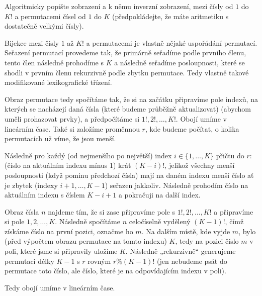 \documentclass[12pt]{article}                   %
\begin{document}
    \begin{priklad}[permBi]
        Algoritmicky popište zobrazení a k němu inverzní zobrazení, mezi čísly od $1$ do $K!$ a permutacemi čísel od $1$ do $K$ (předpokládejte, že máte aritmetiku s dostatečně velkými čísly).

        \begin{reseni}
            Bijekce mezi čísly $1$ až $K!$ a permutacemi je vlastně nějaké uspořádání permutací. Seřazení permutací provedeme tak, že primárně seřadíme podle prvního členu, tento člen následně prohodíme s $K$ a následně seřadíme posloupnosti, které se shodli v prvním členu rekurzivně podle zbytku permutace. Tedy vlastně takové modifikované lexikografické třízení.

            Obraz permutace tedy spočítáme tak, že si na začátku připravíme pole indexů, na kterých se nacházejí daná čísla (které budeme průběžně aktualizovat) (abychom uměli prohazovat prvky), a předpočítáme si $1!, 2!, …, K!$. Obojí umíme v lineárním čase. Také si založíme proměnnou $r$, kde budeme počítat, o kolika permutacích už víme, že jsou menší.

            Následně pro každý (od nejmenšího po největší) index $i \in \{1, …, K\}$ přičtu do $r$: (číslo na aktuálním indexu mínus 1) krát $(K-i)!$, jelikož všechny menší posloupnosti (když pominu předchozí čísla) mají na daném indexu menší číslo ať je zbytek (indexy $i+1, …, K-1$) seřazen jakkoliv. Následně prohodím číslo na aktuálním indexu s číslem $K-i+1$ a pokračuji na další index.

            Obraz čísla $n$ najdeme tím, že si zase připravíme pole s $1!, 2!, …, K!$ a připravíme si pole $1, 2, …, K$. Následně spočítáme $n$ celočíselně vydělený $(K-1)!$, čímž získáme číslo na první pozici, označme ho $m$. Na dalším místě, kde vyjde $m$, bylo (před výpočtem obrazu permutace na tomto indexu) $K$, tedy na pozici číslo $m$ v poli, které jsme si připravily uložíme $K$. Následně „rekurzivně“ generujeme permutaci délky $K-1$ s $r$ rovným $r \% (K-1)!$ (jen nebudeme psát do permutace toto číslo, ale číslo, které je na odpovídajícím indexu v poli).

            Tedy obojí umíme v lineárním čase.
        \end{reseni}
    \end{priklad}
\end{document}
